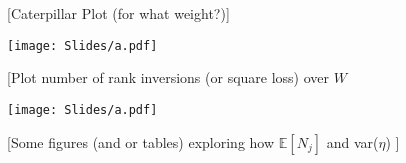 \documentclass[t,aspectratio=169,11pt]{beamer}
\begin{document}
\begin{frame}{[Caterpillar Plot (for what weight?)]}

\centering
{}
\texttt{[image: Slides/a.pdf]}

\end{frame}

\begin{frame}{[Plot number of rank inversions (or square loss) over $W$}

\centering
{}
\texttt{[image: Slides/a.pdf]}

\end{frame}

\begin{frame}{[Some figures (and or tables) exploring how $\mathbb{E}[N_j]$ and var($\eta$) ]}

\centering

\end{frame}
\end{document}

